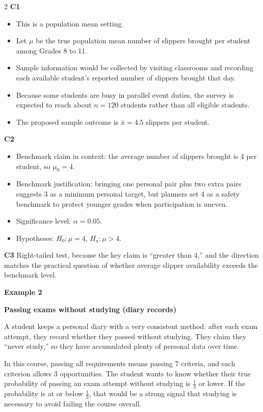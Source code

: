 \documentclass[12pt]{article}
\newcommand{\SubsectionBox}[1]{%
\noindent\colorbox{gray!30}{%
\parbox{\linewidth}{\textbf{#1}}%
}\par\vspace{0.35cm}%
}
\begin{document}
\begin{multicols}{2}
\textbf{C1}
\begin{itemize}
\item This is a population mean setting.
\item Let \(\mu\) be the true population mean number of slippers brought per student among Grades 8 to 11.
\item Sample information would be collected by visiting classrooms and recording each available student's reported number of slippers brought that day.
\item Because some students are busy in parallel event duties, the survey is expected to reach about \(n=120\) students rather than all eligible students.
\item The proposed sample outcome is \(\bar{x}=4.5\) slippers per student.
\end{itemize}

\textbf{C2}
\begin{itemize}
\item Benchmark claim in context: the average number of slippers brought is 4 per student, so \(\mu_0=4\).
\item Benchmark justification: bringing one personal pair plus two extra pairs suggests 3 as a minimum personal target, but planners set 4 as a safety benchmark to protect younger grades when participation is uneven.
\item Significance level: \(\alpha=0.05\).
\item Hypotheses: \(H_0\colon \mu=4\), \(H_a\colon \mu>4\).
\end{itemize}

\textbf{C3}
Right-tailed test, because the key claim is ``greater than 4,'' and the direction matches the practical question of whether average slipper availability exceeds the benchmark level.

\vspace{0.25cm}
\SubsectionBox{Example 2}\vspace{-0.25cm}

\textbf{Passing exams without studying (diary records)}

A student keeps a personal diary with a very consistent method: after each exam attempt, they record whether they passed without studying. They claim they ``never study,'' so they have accumulated plenty of personal data over time.

In this course, passing all requirements means passing 7 criteria, and each criterion allows 3 opportunities. The student wants to know whether their true probability of passing an exam attempt without studying is \(\frac{1}{3}\) or lower. If the probability is at or below \(\frac{1}{3}\), that would be a strong signal that studying is necessary to avoid failing the course overall.


\end{multicols}
\end{document}
